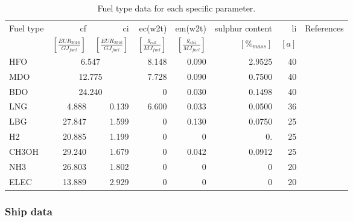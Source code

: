 \documentclass[article]{elsarticle}
\begin{document}
\begin{table}[htb]
    \centering
    \begin{tabular}{lrrrrrrr}
        \toprule
        Fuel type & cf & ci & ec(w2t) & em(w2t) & sulphur content & li & References \\
        & $\left[\frac{EUR_{2016}}{GJ_{fuel}}\right]$ & $\left[\frac{EUR_{2016}}{GJ_{fuel}}\right]$ & $\left[\frac{g_{co2}}{MJ_{fuel}}\right]$ & $\left[\frac{g_{ch4}}{MJ_{fuel}}\right]$ & $\left[\%_{mass}\right]$ & $\left[a\right]$ & \\
        \midrule
        HFO   & \multicolumn{2}{c}{6.547} & 8.148      & 0.090            & 2.9525   & 40   & \cite{BIX2018,Gilbert2018,Bengtsson2012,BRYNOLF2014}    \\
        MDO   & \multicolumn{2}{c}{12.775} & 7.728     & 0.090            & 0.7500   & 40   & \cite{BIX2018,Gilbert2018,Bengtsson2012,Andersson2015}    \\
        BDO   & \multicolumn{2}{c}{24.240} & 0         & 0.030            & 0.1498   & 40   & \cite{SSI2018,Bengtsson2012}    \\
        LNG   & 4.888    & 0.139    & 6.600            & 0.033            & 0.0500   & 36   & \cite{EnerginNet2018,Gilbert2018,BRYNOLF2014,Andersson2015}    \\
        LBG   & 27.847   & 1.599    & 0                & 0.130            & 0.0750   & 25   & \cite{Brynolf2018,Bengtsson2012}    \\
        H2    & 20.885   & 1.199    & 0                & 0                & 0.       & 25   & \cite{Brynolf2018}    \\
        CH3OH & 29.240   & 1.679    & 0                & 0.042            & 0.0912   & 25   & \cite{Brynolf2018,BRYNOLF2014}    \\
        NH3   & 26.803   & 1.802    & 0                & 0                & 0        & 20   & \cite{Morgan2017}    \\
        ELEC  & 13.889   & 2.929    & 0                & 0                & 0        & 20   & \cite{Vree2008}    \\
        \bottomrule
    \end{tabular}
    \caption[Fuel type data]{Fuel type data for each specific parameter.}
    \label{tab:fuel_data}
\end{table}

\subsubsection{Ship data}
\end{document}
